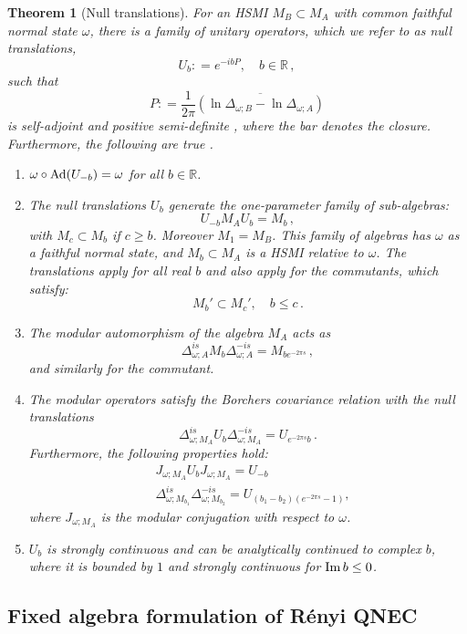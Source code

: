 \documentclass[11pt,a4paper]{article}
\theoremstyle{plain}
\newtheorem{theorem}{Theorem}
\numberwithin{theorem}{section}
\theoremstyle{definition}
\newcommand{\?}{\overset{?}{=}}
\newcommand{\defeq}{\mathrel{\mathop:}=}
\begin{document}
\begin{theorem}[Null translations]\label{thm:modulartranslations}
For an HSMI $M_B\subset M_A$ with common faithful normal state $\omega$, there is a family of unitary operators, which we refer to as null translations,
\[
    U_b\defeq e^{-i b P},\quad b\in \mathbb R\,,
\]
such that 
\[
P\defeq \frac{1}{2\pi} \overline{\left( \ln \Delta_{\omega;B} - \ln \Delta_{\omega;A} \right)}
\]
is self-adjoint and positive semi-definite \cite{Borchers:1991xk}, where the bar denotes the closure.
Furthermore, the following are true \cite{Borchers:1991xk,Wiesbrock:1992mg,Borchers1996,Araki:2005we,Borchers:1995zg}.
\begin{enumerate}
\item $\omega \circ {\rm Ad}(U_{-b})=\omega$ for all $b\in \mathbb R$.
\item The null translations $U_b$ generate the one-parameter family of sub-algebras:
\[
U_{-b} M_{A} U_{b} = M_{b}\,,
\]
with $M_{c}\subset M_{b}$ if $c\geq b$. Moreover $M_{{1}} =M_{B}$. This family of algebras has $\omega$ as a faithful normal state, and $M_b \subset M_A$ is a HSMI relative to $\omega$. The translations apply for all real $b$ and also apply for the commutants, which satisfy:
\[
 M_{b}' \subset M_{c}', \quad b \leq c\,.
\]
\item The modular automorphism of the algebra $M_A$ acts as
\[
\Delta_{\omega;A}^{is} M_{b} \Delta_{\omega;A}^{-is} = M_{b e^{-2\pi s}}\,,
\]
and similarly for the commutant.
\item The modular operators satisfy the Borchers covariance relation with the null translations
\[
    \Delta_{\omega;M_A}^{is} U_b \Delta_{\omega;M_A}^{-is} =   U_{e^{-2\pi s}b}  \,.
\]
Furthermore, the following properties hold:
\begin{align*}
 &J_{\omega;M_A} U_b J_{\omega;M_A}  =U_{-b} \\
  &\Delta^{is} _{\omega;M_{b_1}} \Delta_{\omega;M_{b_2}}^{-is} = U_{ (b_1-b_2) (e^{-2\pi s} -1)} \nonumber,
\end{align*}
where $J_{\omega;M_A}$ is the modular conjugation with respect to $\omega$.
\item $U_b$ is strongly continuous and can be analytically continued to complex $b$, where it is bounded by $1$ and strongly continuous for ${\rm Im}\, b \leq 0$.
\end{enumerate}
\end{theorem}

\subsection{Fixed algebra formulation of R\'{e}nyi QNEC}
\end{document}
